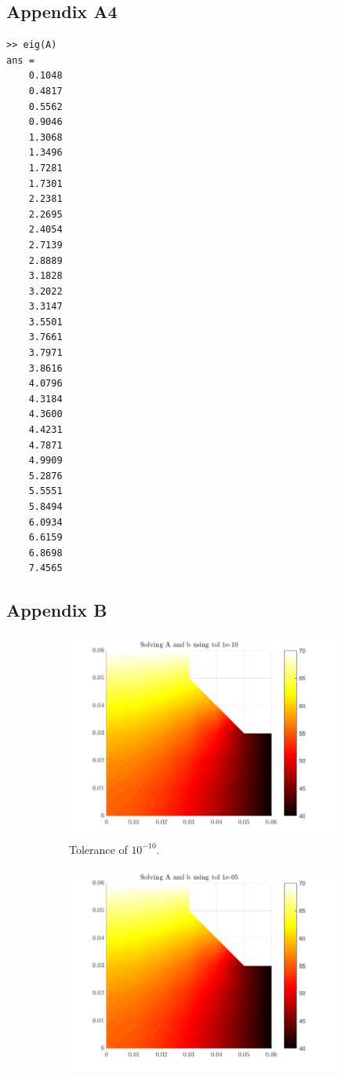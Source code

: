 \documentclass[12pt,a4paper]{article}
\begin{document}
\subsection*{Appendix A4}
\begin{verbatim}
>> eig(A)
ans =
	0.1048
	0.4817
	0.5562
	0.9046
	1.3068
	1.3496
	1.7281
	1.7301
	2.2381
	2.2695
	2.4054
	2.7139
	2.8889
	3.1828
	3.2022
	3.3147
	3.5501
	3.7661
	3.7971
	3.8616
	4.0796
	4.3184
	4.3600
	4.4231
	4.7871
	4.9909
	5.2876
	5.5551
	5.8494
	6.0934
	6.6159
	6.8698
	7.4565
\end{verbatim}
\subsection*{Appendix B}
\begin{figure}
	\centering
	\begin{subfigure}[b]{0.4\textwidth}
		\centering
		\includegraphics[width=\textwidth]{images/Comparisontole-10.png}
		\caption{Tolerance of $10^{-10}$.}
		\label{fig:tole-10}
	\end{subfigure}
	\hfill
	\begin{subfigure}[b]{0.4\textwidth}
		\centering
		\includegraphics[width=\linewidth]{images/Comparisontole-05.png}

\end{subfigure}
\end{figure}
\end{document}
